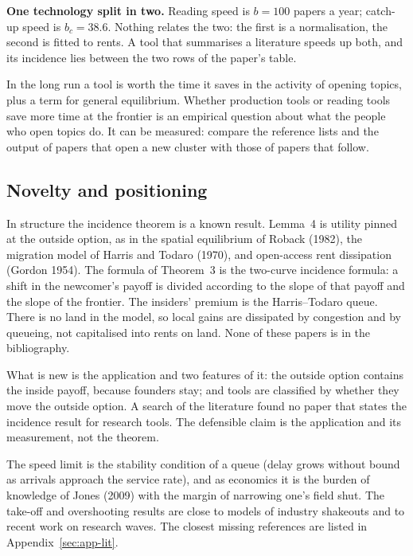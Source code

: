 \textbf{One technology split in two.} Reading speed is $b=100$ papers a year; catch-up speed is $b_c=38.6$. Nothing relates the two: the first is a normalisation, the second is fitted to rents. A tool that summarises a literature speeds up both, and its incidence lies between the two rows of the paper's table.

\begin{ideabox}
In the long run a tool is worth the time it saves in the activity of opening topics, plus a term for general equilibrium. Whether production tools or reading tools save more time at the frontier is an empirical question about what the people who open topics do. It can be measured: compare the reference lists and the output of papers that open a new cluster with those of papers that follow.
\end{ideabox}

\subsection{Novelty and positioning}\label{sec:crit-novelty}

In structure the incidence theorem is a known result. Lemma~4 is utility pinned at the outside option, as in the spatial equilibrium of Roback (1982), the migration model of Harris and Todaro (1970), and open-access rent dissipation (Gordon 1954). The formula of Theorem~3 is the two-curve incidence formula: a shift in the newcomer's payoff is divided according to the slope of that payoff and the slope of the frontier. The insiders' premium is the Harris--Todaro queue. There is no land in the model, so local gains are dissipated by congestion and by queueing, not capitalised into rents on land. None of these papers is in the bibliography.

What is new is the application and two features of it: the outside option contains the inside payoff, because founders stay; and tools are classified by whether they move the outside option. A search of the literature found no paper that states the incidence result for research tools. The defensible claim is the application and its measurement, not the theorem.

The speed limit is the stability condition of a queue (delay grows without bound as arrivals approach the service rate), and as economics it is the burden of knowledge of Jones (2009) with the margin of narrowing one's field shut. The take-off and overshooting results are close to models of industry shakeouts and to recent work on research waves. The closest missing references are listed in Appendix~\ref{sec:app-lit}.

